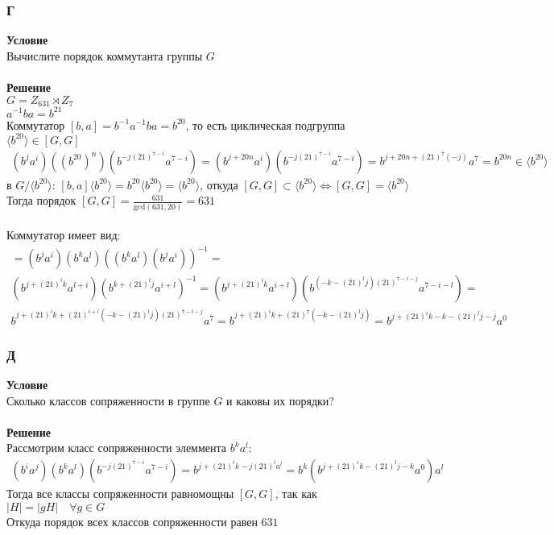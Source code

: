 			\subsubsection*{Г}
			\textbf{Условие}\\
			Вычислите порядок коммутанта группы $G$\\
			\\
			\textbf{Решение}\\
			$G = Z_{631} \rtimes Z_{7}$\\
			$a^{-1} b a = b^{21}$\\
			Коммутатор $[b,a] = b^{-1} a^{-1} ba = b^{20}$, то есть циклическая подгруппа $\langle b^{20} \rangle \in [G,G]$\\
			\begin{gather*}
				(b^{j} a^{i})((b^{20})^{n})(b^{-j(21)^{7-i}} a^{7-i}) = (b^{j + 20n} a^{i})(b^{-j(21)^{7-i}} a^{7-i}) = b^{j + 20n + (21)^{7}(-j)} a^{7} = b^{20n} \in \langle b^{20} \rangle
			\end{gather*}
			в $G\slash \langle b^{20} \rangle$: $[b,a]\langle b^{20} \rangle = b^{20}\langle b^{20} \rangle = \langle b^{20} \rangle$, откуда $[G,G] \subset \langle b^{20} \rangle \Leftrightarrow [G,G] = \langle b^{20} \rangle$\\
			Тогда порядок $[G,G] = \frac{631}{\text{gcd}(631, 20)} = 631$\\
			\\
			Коммутатор имеет вид:
			\begin{gather*}
				[b^{j} a^{i}, b^{k} a^{l}] = 
				(b^{j} a^{i})(b^{k} a^{l})((b^{k} a^{l})(b^{j} a^{i}))^{-1} =\\
				(b^{j + (21)^{i} k} a^{l+i})(b^{k+(21)^{l}j} a^{i+l})^{-1} = 
				(b^{j + (21)^{i}k} a^{i+l})(b^{(-k-(21)^{l}j)(21)^{7-i-j}} a^{7-i-l}) = \\
				b^{j + (21)^{i}k + (21)^{i+l}(-k-(21)^{l}j)(21)^{7-i-j}} a^{7} = 
				b^{j + (21)^{i}k + (21)^{7}(-k-(21)^{l}j)} = b^{j + (21)^{i}k - k - (21)^{l}j - j} a^{0}
			\end{gather*} 
			
			
			\subsubsection*{Д}
			\textbf{Условие}\\
			Сколько классов сопряженности в группе $G$ и каковы их порядки?\\
			\\
			\textbf{Решение}\\
			Рассмотрим класс сопряженности элеммента $b^{k} a^{l}$:
			\begin{gather*}
				(b^{i} a^{j})(b^{k} a^{l})(b^{-j(21)^{7-i}} a^{7-i}) = b^{j + (21)^{i}k - j(21)^{l} a^{l}} = b^{k} (b^{j + (21)^{i}k - (21)^{l}j - k} a^{0}) a^{l}
			\end{gather*}
			Тогда все классы сопряженности равномощны $[G,G]$, так как $|H| = |gH|\quad \forall g \in G$\\
			Откуда порядок всех классов сопряженности равен $631$ 
			
